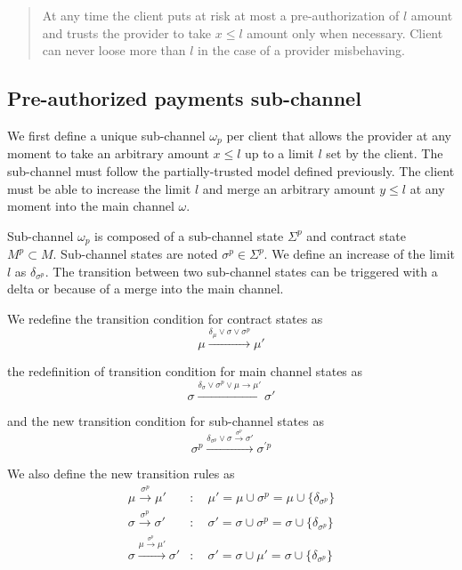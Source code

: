 \documentclass{llncs}
\begin{document}
\begin{quote}
    At any time the client puts at risk at most a pre-authorization of $l$ amount and trusts the provider to take $x \leq l$ amount only when necessary. Client can never loose more than $l$ in the case of a provider misbehaving.
\end{quote}

\subsection{Pre-authorized payments sub-channel} We first define a unique sub-channel $\omega_p$ per client that allows the provider at any moment to take an arbitrary amount $x \leq l$ up to a limit $l$ set by the client. The sub-channel must follow the partially-trusted model defined previously. The client must be able to increase the limit $l$ and merge an arbitrary amount $y \leq l$ at any moment into the main channel $\omega$.


Sub-channel $\omega_p$ is composed of a sub-channel state $\Sigma^p$ and contract state $M^p \subset M$. Sub-channel states are noted $\sigma^p \in \Sigma^p$. We define an increase of the limit $l$ as $\delta_{\sigma^p}$. The transition between two sub-channel states can be triggered with a delta or because of a merge into the main channel.

We redefine the transition condition for contract states as
$$\mu \xrightarrow{\delta_\mu \lor \sigma \lor \sigma^p} \mu'$$

the redefinition of transition condition for main channel states as
$$\sigma \xrightarrow{\delta_\sigma \lor \sigma^p \lor \mu \rightarrow \mu'} \sigma'$$

and the new transition condition for sub-channel states as
$$\sigma^p \xrightarrow{\delta_{\sigma^p} \lor \sigma \xrightarrow{\sigma^p} \sigma'} \sigma^{\prime p}$$

We also define the new transition rules as
\begin{equation*}
\begin{split}
    \mu \xrightarrow{\sigma^p} \mu' &: \quad \mu' = \mu \cup \sigma^p = \mu \cup \{ \delta_{\sigma^p} \} \\
    \sigma \xrightarrow{\sigma^p} \sigma' &: \quad \sigma' = \sigma \cup \sigma^p = \sigma \cup \{ \delta_{\sigma^p} \} \\
    \sigma \xrightarrow{\mu \xrightarrow{\sigma^p} \mu'} \sigma' &: \quad \sigma' =  \sigma \cup \mu' = \sigma \cup \{ \delta_{\sigma^p} \} \\
\end{split}
\end{equation*}
\end{document}

